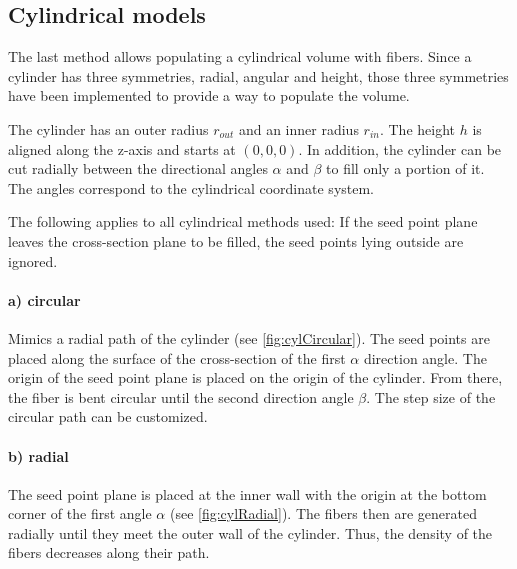 \subsection{Cylindrical models}
%
The last method allows populating a cylindrical volume with fibers.
Since a cylinder has three symmetries, radial, angular and height, those three symmetries have been implemented to provide a way to populate the volume.
\par
%
The cylinder has an outer radius $r_{\mathit{out}}$ and an inner radius $r_{\mathit{in}}$.
The height $h$ is aligned along the z-axis and starts at $(0,0,0)$.
In addition, the cylinder can be cut radially between the directional angles $\alpha$ and $\beta$ to fill only a portion of it.
The angles correspond to the cylindrical coordinate system.
\par
%
The following applies to all cylindrical methods used: If the seed point plane leaves the cross-section plane to be filled, the seed points lying outside are ignored.
%
\paragraph{a) circular}
Mimics a radial path of the cylinder (see \cref{fig:cylCircular}).
The seed points are placed along the surface of the cross-section of the first $\alpha$ direction angle.
The origin of the seed point plane is placed on the origin of the cylinder.
From there, the fiber is bent circular until the second direction angle $\beta$.
The step size of the circular path can be customized.
%
\paragraph{b) radial}
The seed point plane is placed at the inner wall with the origin at the bottom corner of the first angle $\alpha$ (see \cref{fig:cylRadial}).
The fibers then are generated radially until they meet the outer wall of the cylinder.
Thus, the density of the fibers decreases along their path.
%
